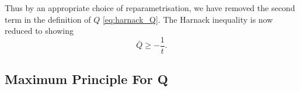 \documentclass{amsart}
\begin{document}
Thus by an appropriate choice of reparametrisation, we have removed the second term in the definition of \(Q\) \eqref{eq:harnack_Q}. The Harnack inequality is now reduced to showing
\begin{equation}
\label{eq:harnack_reparam}
\bar{Q} \geq - \frac{1}{t}.
\end{equation}

\subsection{Maximum Principle For Q}
\label{subsec:harnack_Q}
\end{document}
